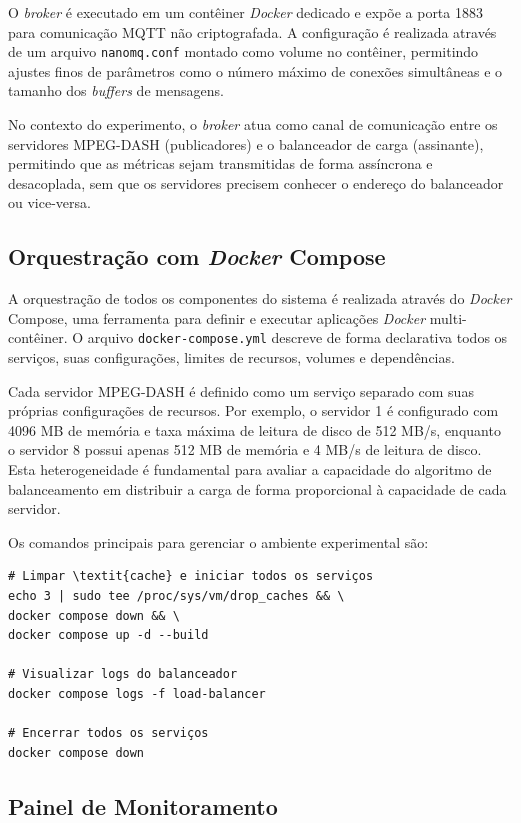 O \textit{broker} é executado em um contêiner \textit{Docker} dedicado e expõe a porta 1883 para comunicação MQTT não criptografada. A configuração é realizada através de um arquivo \texttt{nanomq.conf} montado como volume no contêiner, permitindo ajustes finos de parâmetros como o número máximo de conexões simultâneas e o tamanho dos \textit{buffers} de mensagens.

No contexto do experimento, o \textit{broker} atua como canal de comunicação entre os servidores MPEG-DASH (publicadores) e o balanceador de carga (assinante), permitindo que as métricas sejam transmitidas de forma assíncrona e desacoplada, sem que os servidores precisem conhecer o endereço do balanceador ou vice-versa.

\subsection{Orquestração com \textit{Docker} Compose}

A orquestração de todos os componentes do sistema é realizada através do \textit{Docker} Compose, uma ferramenta para definir e executar aplicações \textit{Docker} multi-contêiner. O arquivo \texttt{docker-compose.yml} descreve de forma declarativa todos os serviços, suas configurações, limites de recursos, volumes e dependências.

Cada servidor MPEG-DASH é definido como um serviço separado com suas próprias configurações de recursos. Por exemplo, o servidor 1 é configurado com 4096 MB de memória e taxa máxima de leitura de disco de 512 MB/s, enquanto o servidor 8 possui apenas 512 MB de memória e 4 MB/s de leitura de disco. Esta heterogeneidade é fundamental para avaliar a capacidade do algoritmo de balanceamento em distribuir a carga de forma proporcional à capacidade de cada servidor.

Os comandos principais para gerenciar o ambiente experimental são:

\begin{verbatim}
# Limpar \textit{cache} e iniciar todos os serviços
echo 3 | sudo tee /proc/sys/vm/drop_caches && \
docker compose down && \
docker compose up -d --build

# Visualizar logs do balanceador
docker compose logs -f load-balancer

# Encerrar todos os serviços
docker compose down
\end{verbatim}

\subsection{Painel de Monitoramento}

